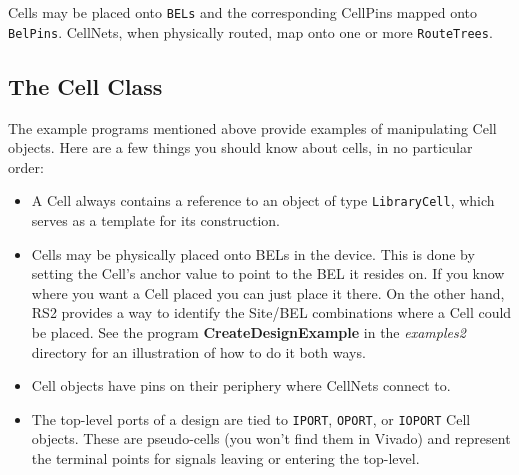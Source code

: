 \documentclass[12pt]{article}
\newcommand{\cls}[1]{{\texttt{#1}}}
\newcommand{\pgm}[1]{{\textbf{#1}}}
\newcommand{\dir}[1]{{\em #1}}
\begin{document}
Cells may be placed onto \cls{BELs} and the corresponding CellPins mapped onto
\cls{BelPins}.  CellNets, when physically routed, map onto one or more
\cls{RouteTrees}.

\subsection{The Cell Class}
The example programs mentioned above provide examples of manipulating Cell
objects.  Here are a few things you should know about cells, in no particular
order: 
\begin{itemize}
\item A Cell always contains a reference to an object of type \cls{LibraryCell},
which serves as a template for its construction.
\item Cells may be physically  placed onto BELs in the device.  This is done by
setting the Cell’s anchor value to point to the BEL it resides on.  If you know
where you want a Cell placed you can just place it there.  On the other hand,
RS2 provides a way to identify the Site/BEL combinations where a Cell could be
placed.  See the program \pgm{CreateDesignExample} in the \dir{examples2}
directory for an illustration of how to do it both ways.
\item Cell objects have pins on their periphery where CellNets connect to.
\item The top-level ports of a design are tied to \cls{IPORT}, \cls{OPORT}, or
\cls{IOPORT} Cell objects.  These are pseudo-cells (you won’t find them in
Vivado) and represent the terminal points for signals leaving or entering the top-level.  
\end{itemize}
\end{document}

